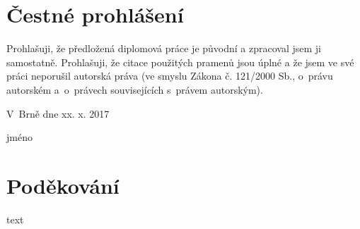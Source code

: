 \documentclass[12pt,twoside,a4paper]{report}
\renewcommand{\baselinestretch}{1.5}
\newcommand{\blank}[1]{\hspace*{#1}}
\begin{document}
\newpage
\hbox{}
\vfill

\section*{Čestné prohlášení}
Prohlašuji, že předložená diplomová práce je původní a zpracoval jsem ji samostatně. Prohlašuji, že citace použitých pramenů jsou úplné a že jsem ve své práci neporušil autorská práva (ve smyslu Zákona č. 121/2000 Sb., o~právu autorském a~o~právech souvisejících s~právem autorským).
\\
\par V~Brně dne xx. x. 2017 %
\hfill\dotuline{\blank{5cm}}\hskip2cm
\par\hfill jméno \hskip5cm\blank{-4cm}
\vskip1cm

\newpage
\hbox{}
\vfill

\section*{Poděkování}
text
\vskip1cm

\renewcommand{\baselinestretch}{1}
\tableofcontents


\renewcommand{\baselinestretch}{1.5}



\pagestyle{plain}     %





\newpage

\listoffigures
{}
\newpage
\listoftables
{}
\newpage
{}

\end{document}
